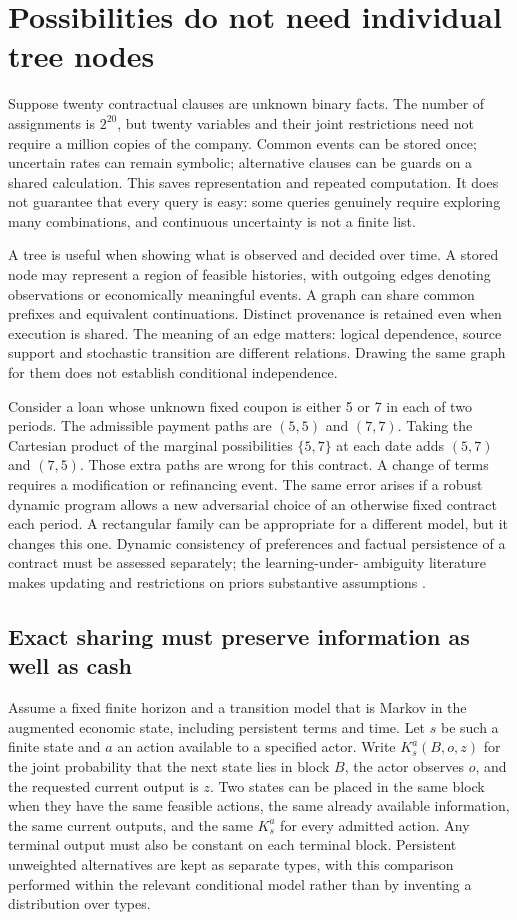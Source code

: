 \documentclass[11pt,a4paper]{article}
\begin{document}
\section{Possibilities do not need individual tree nodes}
Suppose twenty contractual clauses are unknown binary facts. The number of
assignments is $2^{20}$, but twenty variables and their joint restrictions need
not require a million copies of the company. Common events can be stored once;
uncertain rates can remain symbolic; alternative clauses can be guards on a
shared calculation. This saves representation and repeated computation. It
does not guarantee that every query is easy: some queries genuinely require
exploring many combinations, and continuous uncertainty is not a finite list.

A tree is useful when showing what is observed and decided over time. A stored
node may represent a region of feasible histories, with outgoing edges denoting
observations or economically meaningful events. A graph can share common
prefixes and equivalent continuations. Distinct provenance is retained even
when execution is shared. The meaning of an edge matters: logical dependence,
source support and stochastic transition are different relations. Drawing the
same graph for them does not establish conditional independence.

Consider a loan whose unknown fixed coupon is either 5 or 7 in each of two
periods. The admissible payment paths are $(5,5)$ and $(7,7)$. Taking the
Cartesian product of the marginal possibilities $\{5,7\}$ at each date adds
$(5,7)$ and $(7,5)$. Those extra paths are wrong for this contract. A change of
terms requires a modification or refinancing event. The same error arises if a
robust dynamic program allows a new adversarial choice of an otherwise fixed
contract each period. A rectangular family can be appropriate for a different
model, but it changes this one. Dynamic consistency of preferences and factual
persistence of a contract must be assessed separately; the learning-under-
ambiguity literature makes updating and restrictions on priors substantive
assumptions \cite{epstein}.

\subsection{Exact sharing must preserve information as well as cash}
Assume a fixed finite horizon and a transition model that is Markov in the
augmented economic state, including persistent terms and time. Let $s$ be
such a finite state and $a$ an action available to a specified
actor. Write $K_s^a(B,o,z)$ for the joint probability that the next state lies
in block $B$, the actor observes $o$, and the requested current output is $z$.
Two states can be placed in the same block when they have the same feasible
actions, the same already available information, the same current outputs,
and the same $K_s^a$ for every admitted action. Any terminal output must also
be constant on each terminal block. Persistent unweighted alternatives are
kept as separate types, with this comparison performed within the relevant
conditional model rather than by inventing a distribution over types.
\end{document}
